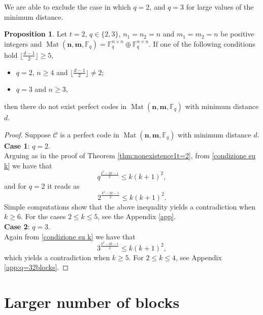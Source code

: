 \documentclass[11pt]{amsart}
\DeclareMathOperator{\Mat}{Mat}
\theoremstyle{definition}
\newtheorem{proposition}[theorem]{Proposition}
\newcommand{\F}{{\mathbb F}}
\newcommand{\bfn}{\mathbf {n}}
\newcommand{\bfm}{\mathbf {m}}
\newcommand{\spacmn}{\Mat(\bfn,\bfm,\F_q)}
\begin{document}
We are able to exclude the case in which $q=2$, and $q=3$ for large values of the minimum distance.

\begin{proposition}\label{prop:q=2,3nonexistencecomplete}
Let $t=2$, $q\in \{2,3\}$, $ n_1 = n_2 = n $ and $ m_1 = m_2 = n $ be positive integers and $\spacmn=\mathbb{F}_q^{n\times n}\oplus\mathbb{F}_q^{n\times n}$.
If one of the following conditions hold $\lfloor \frac{d-1}2\rfloor \geq 5$, 
\begin{itemize}
    \item $q=2$, $n\geq 4$ and $\lfloor \frac{d-1}2\rfloor \ne 2$;
    \item $q=3$ and $n\geq 3$,
\end{itemize}
then there do not exist perfect codes in $\spacmn$ with minimum distance $d$.
\end{proposition}
\begin{proof}
Suppose $\mathcal{C}$ is a perfect code in $\spacmn$ with minimum distance $d$.  \\
\textbf{Case 1}: $q=2$.\\
Arguing as in the proof of Theorem \ref{thm:nonexistence1t=2}, from \eqref{condizione su k} we have that
\[
q^{\frac{k^2-2k-1}{2}}\leq k(k+1)^2,
\]
and for $q=2$ it reads as
\[
2^{\frac{k^2-2k-1}{2}}\leq k(k+1)^2.
\] 
Simple computations show that the above inequality yields a contradiction when $k\geq 6$.
For the cases $2\leq k\leq 5$, see the Appendix \ref{app}. 
\\
\textbf{Case 2}: $q=3$.\\
Again from \eqref{condizione su k} we have that
\[
3^{\frac{k^2-2k-1}{2}}\leq k(k+1)^2,
\]
which yields a contradiction when $k\geq5$. For $2\leq k \leq 4$, see Appendix \ref{app:q=32blocks}.
\end{proof}

\section{Larger number of blocks}\label{sec:t>2}
\end{document}
